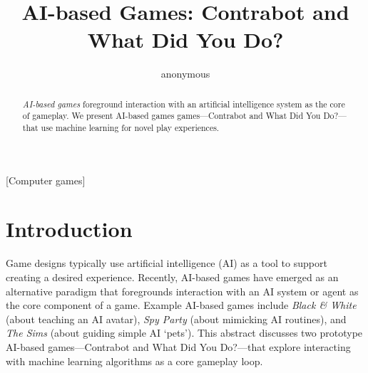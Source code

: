 \documentclass{sig-alternate}
\begin{document}

\title{AI-based Games: Contrabot and What Did You Do?}


\author{
\alignauthor
anonymous
}

\toappear{}

\maketitle
\begin{abstract}
{\it AI-based games} foreground interaction with an artificial intelligence system as the core of gameplay.
We present AI-based games games---{\sc Contrabot} and {\sc What Did You Do?}---that use machine learning for novel play experiences.
\end{abstract}

[Computer games]




\section{Introduction}

\noindent Game designs typically use artificial intelligence (AI) as a tool to support creating a desired experience.
Recently, AI-based games have emerged as an alternative paradigm that foregrounds interaction with an AI system or agent as the core component of a game.
Example AI-based games include {\it Black \& White} (about teaching an AI avatar), {\it Spy Party} (about mimicking AI routines), and {\it The Sims} (about guiding simple AI `pets').
This abstract discusses two prototype AI-based games---{\sc Contrabot} and {\sc What Did You Do?}---that explore interacting with machine learning algorithms as a core gameplay loop.
\end{document}
